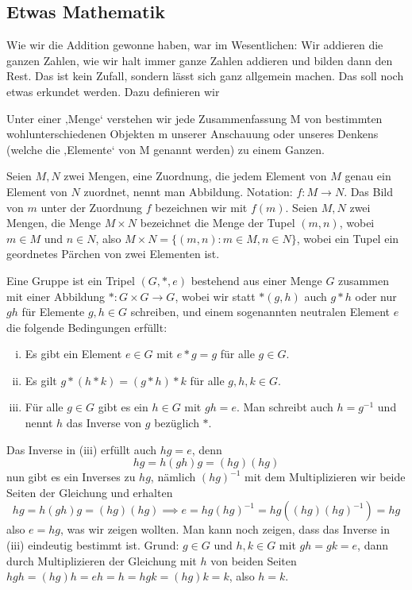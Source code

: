 \subsection*{Etwas Mathematik}
Wie wir die Addition gewonne haben, war im Wesentlichen: Wir addieren die ganzen Zahlen, wie wir halt immer ganze Zahlen addieren und bilden dann den Rest. Das ist kein Zufall, sondern lässt sich ganz allgemein machen. Das soll noch etwas erkundet werden. 
Dazu definieren wir 
\begin{defn}
    Unter einer ‚Menge‘ verstehen wir jede Zusammenfassung M von bestimmten wohlunterschiedenen Objekten m unserer Anschauung oder unseres Denkens (welche die ‚Elemente‘ von M genannt werden) zu einem Ganzen.
\end{defn}
\begin{defn}[Abbildung]
    Seien $M,N$ zwei Mengen, eine Zuordnung, die jedem Element von $M$ genau ein Element von $N$ zuordnet, nennt man Abbildung. Notation: $f:M\to N$. Das Bild von $m$ unter der Zuordnung $f$ bezeichnen wir mit $f(m)$.
    Seien $M,N$ zwei Mengen, die Menge $M\times N$ bezeichnet die Menge der Tupel $(m,n)$, wobei $m\in M$ und $n\in N$, also $M\times N = \{(m,n):m\in M, n\in N\}$, wobei ein Tupel ein geordnetes Pärchen von zwei Elementen ist.
\end{defn}
\begin{defn}[Gruppe]
    Eine Gruppe ist ein Tripel $(G,*,e)$ bestehend aus einer Menge $G$ zusammen mit einer Abbildung $*:G\times G\to G$, wobei wir statt $*(g,h)$ auch $g*h$ oder nur $gh$ für Elemente $g,h\in G$ schreiben, und einem sogenannten neutralen Element $e$ die folgende Bedingungen erfüllt:
    \begin{enumerate}[(i)]
        \item Es gibt ein Element $e\in G$ mit $e*g=g$ für alle $g\in G$.
        \item Es gilt $g*(h*k)=(g*h)*k$ für alle $g,h,k\in G$.
        \item Für alle $g\in G$ gibt es ein $h\in G$ mit $gh=e$. Man schreibt auch $h=g^{-1}$ und nennt $h$ das Inverse von $g$ bezüglich $*$.
    \end{enumerate}
\end{defn}
Das Inverse in (iii) erfüllt auch $hg=e$, denn 
\[
    hg=h(gh)g=(hg)(hg) 
\]
nun gibt es ein Inverses zu $hg$, nämlich $(hg)^{-1}$ mit dem Multiplizieren wir beide Seiten der Gleichung und erhalten
\[
hg=h(gh)g=(hg)(hg)\implies e=hg (hg)^{-1} = hg((hg)(hg)^{-1})=hg     
\]
also $e=hg$, was wir zeigen wollten. Man kann noch zeigen, dass das Inverse in (iii) eindeutig bestimmt ist. Grund: $g\in G$ und $h,k\in G$ mit $gh=gk=e$, dann durch Multiplizieren der Gleichung mit $h$ von beiden Seiten $hgh=(hg)h=eh=h=hgk=(hg)k=k$, also $h=k$.
